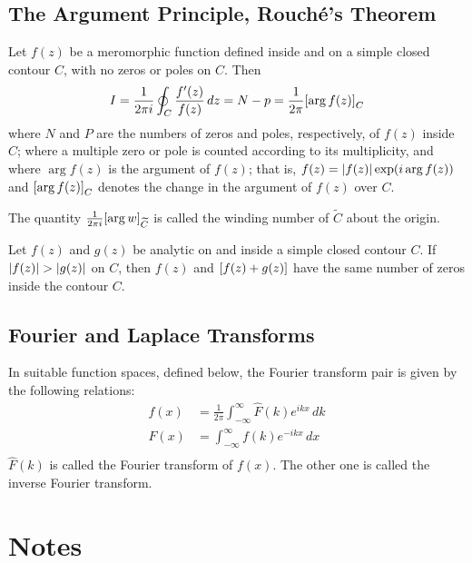     \subsection{The Argument Principle, Rouch\'e's Theorem}
    \begin{thm}
        Let $f(z)$ be a meromorphic function defined inside and on a simple
        closed contour $C$, with no zeros or poles on $C$. Then
        \begin{align*}
            I =
            \frac{1}{2\pi i} \oint_C \frac{f^\prime(z)}{f(z)} \, dz =
            N - p =
            \frac{1}{2\pi} {\left[ \arg f(z) \right]}_C
        \end{align*}
        where $N$ and $P$ are the numbers of zeros and poles, respectively, of
        $f(z)$ inside $C$; where a multiple zero or pole is counted according to
        its multiplicity, and where $\arg f(z)$ is the argument of $f(z)$; that
        is, $f(z)=\left\lvert f(z) \right\rvert \exp(i \arg f(z))$ and ${\left[ \arg f(z) \right]}_C$ denotes
        the change in the argument of $f(z)$ over $C$.
    \end{thm}
    The quantity $\frac{1}{2\pi i} {\left[ \arg w \right]}_{\widetilde{C}}$ is called the
    winding number of $\widetilde{C}$ about the origin. %
    \begin{thm}[Rouch\'e]
        Let $f(z)$ and $g(z)$ be analytic on and inside a simple closed contour
        $C$. If $\left\lvert f(z) \right\rvert > \left\lvert g(z) \right\rvert$ on $C$, then $f(z)$ and
        ${\left[ f(z)+g(z) \right]}$ have the same number of zeros inside the contour $C$.
    \end{thm}

    \subsection{Fourier and Laplace Transforms}
    In suitable function spaces, defined below, the Fourier transform pair is
    given by the following relations:
    \begin{align*}
        f(x) &= \frac{1}{2\pi} \int_{-\infty}^\infty \hat{F}(k) e^{ikx} \, dk\\
        F(x) &= \int_{-\infty}^\infty f(k) e^{-ikx} \, dx\\
    \end{align*}
    $\hat{F}(k)$ is called the Fourier transform of $f(x)$. The other one is
    called the inverse Fourier transform.

\section{Notes}

